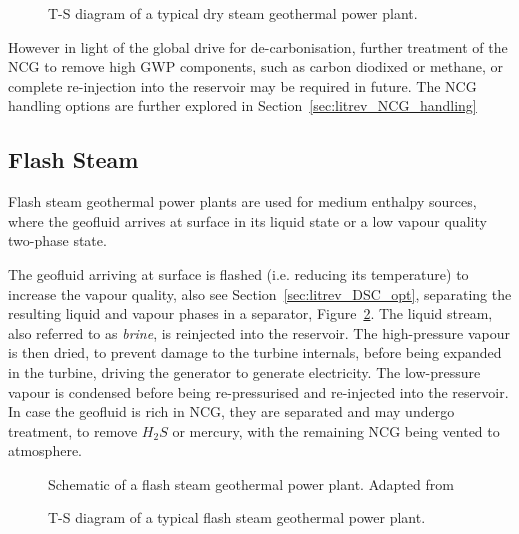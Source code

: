         \begin{figure}[H]
            \centering
            
            \caption{T-S diagram of a typical dry steam geothermal power plant.}
            \label{fig:litrev_dry_steam_TS}
        \end{figure}

        However in light of the global drive for de-carbonisation, further treatment of the \ac{NCG} to remove high \ac{GWP} components, such as carbon diodixed or methane, or complete re-injection into the reservoir may be required in future. The \ac{NCG} handling options are further explored in Section~\ref{sec:litrev_NCG_handling}    

    \subsection{Flash Steam}
        Flash steam geothermal power plants are used for medium enthalpy sources, where the geofluid arrives at surface in its liquid state or a low vapour quality two-phase state.


        The geofluid arriving at surface is flashed (i.e. reducing its temperature) to increase the vapour quality, also see Section~\ref{sec:litrev_DSC_opt}, separating the resulting liquid and vapour phases in a separator, Figure~\ref{fig:litrev_singleflash_schematic}. The liquid stream, also referred to as \emph{brine}, is reinjected into the reservoir. The high-pressure vapour is then dried, to prevent damage to the turbine internals, before being expanded in the turbine, driving the generator to generate electricity. The low-pressure vapour is condensed before being re-pressurised and re-injected into the reservoir. In case the geofluid is rich in \ac{NCG}, they are separated and may undergo treatment, to remove \(H_2S\) or mercury, with the remaining \ac{NCG} being vented to atmosphere.
        
        \begin{figure}[H]
            \centering
            
            \caption{Schematic of a flash steam geothermal power plant. Adapted from \cite{DiPippo2016}}
            \label{fig:litrev_singleflash_schematic}
        \end{figure}

        \begin{figure}[H]
            \centering
            
            \caption{T-S diagram of a typical flash steam geothermal power plant.}
            \label{fig:litrev_singleflash_TS}
        \end{figure}
        
